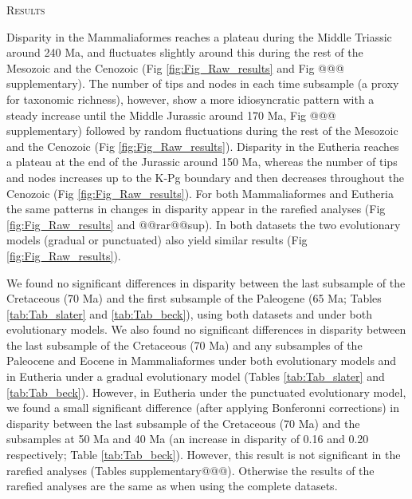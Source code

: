 \documentclass[12pt,letterpaper]{article}
\renewcommand{\section}[1]{%
\bigskip
\begin{center}
\begin{Large}
\normalfont\scshape #1
\medskip
\end{Large}
\end{center}}
\begin{document}
%
%

\section{Results}
Disparity in the Mammaliaformes reaches a plateau during the Middle Triassic around 240 Ma, and fluctuates slightly around this during the rest of the Mesozoic and the Cenozoic (Fig \ref{fig:Fig_Raw_results} and Fig @@@ supplementary).
The number of tips and nodes in each time subsample (a proxy for taxonomic richness), however, show a more idiosyncratic pattern with a steady increase until the Middle Jurassic around 170 Ma, Fig @@@ supplementary) followed by random fluctuations during the rest of the Mesozoic and the Cenozoic (Fig \ref{fig:Fig_Raw_results}).
Disparity in the Eutheria reaches a plateau at the end of the Jurassic around 150 Ma, whereas the number of tips and nodes increases up to the K-Pg boundary and then decreases throughout the Cenozoic (Fig \ref{fig:Fig_Raw_results}).
For both Mammaliaformes and Eutheria the same patterns in changes in disparity appear in the rarefied analyses (Fig \ref{fig:Fig_Raw_results} and @@rar@@sup).
In both datasets the two evolutionary models (gradual or punctuated) also yield similar results (Fig \ref{fig:Fig_Raw_results}).

We found no significant differences in disparity between the last subsample of the Cretaceous (70 Ma) and the first subsample of the Paleogene (65 Ma; Tables \ref{tab:Tab_slater} and \ref{tab:Tab_beck}), using both datasets and under both evolutionary models. 
We also found no significant differences in disparity between the last subsample of the Cretaceous (70 Ma) and any subsamples of the Paleocene and Eocene in Mammaliaformes under both evolutionary models and in Eutheria under a gradual evolutionary model (Tables \ref{tab:Tab_slater} and \ref{tab:Tab_beck}).
However, in Eutheria under the punctuated evolutionary model, we found a small significant difference (after applying Bonferonni corrections) in disparity between the last subsample of the Cretaceous (70 Ma) and the subsamples at 50 Ma and 40 Ma (an increase in disparity of 0.16 and 0.20 respectively; Table \ref{tab:Tab_beck}). %
However, this result is not significant in the rarefied analyses (Tables supplementary@@@). 
Otherwise the results of the rarefied analyses are the same as when using the complete datasets. 
\end{document}
